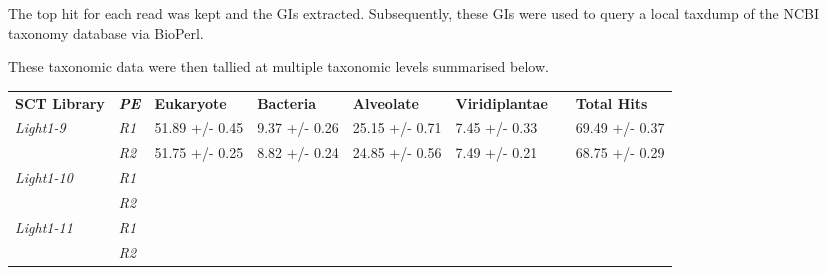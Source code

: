 The top hit for each read was kept and the GIs extracted.  Subsequently, these GIs were used to query
a local taxdump of the NCBI taxonomy database via BioPerl.

These taxonomic data were then tallied at multiple taxonomic levels summarised below.




\begin{table}[h]
\begin{tabular}{@{}|l|l|llllll@{}}
\toprule
\textbf{SCT Library} & \textit{\textbf{PE}} & \multicolumn{1}{l|}{\textbf{Eukaryote}} & \multicolumn{1}{l|}{\textbf{Bacteria}} & \multicolumn{1}{l|}{\textbf{Alveolate}} & \multicolumn{1}{l|}{\textbf{Viridiplantae}} & \multicolumn{1}{l|}{} & \multicolumn{1}{l|}{\textbf{Total Hits}} \\ \cmidrule(r){1-6} \cmidrule(l){8-8} 
\textit{Light1-9}    & \textit{R1}          & \multicolumn{1}{l|}{51.89 +/- 0.45}     & \multicolumn{1}{l|}{9.37 +/- 0.26}     & \multicolumn{1}{l|}{25.15 +/-  0.71}    & \multicolumn{1}{l|}{7.45 +/- 0.33}          & \multicolumn{1}{l|}{} & 69.49 +/- 0.37                           \\ \cmidrule(lr){2-2}
                     & \textit{R2}          & 51.75 +/- 0.25                          & 8.82 +/- 0.24                          & 24.85 +/- 0.56                          & 7.49 +/- 0.21                               &                       & 68.75 +/- 0.29                           \\ \cmidrule(r){1-2}
\textit{Light1-10}   & \textit{R1}          &                                         &                                        &                                         & \multicolumn{1}{l|}{}                       & \multicolumn{1}{l|}{} &                                          \\ \cmidrule(lr){2-2}
                     & \textit{R2}          &                                         &                                        &                                         &                                             &                       &                                          \\ \cmidrule(r){1-2}
\textit{Light1-11}   & \textit{R1}          &                                         &                                        &                                         & \multicolumn{1}{l|}{}                       & \multicolumn{1}{l|}{} &                                          \\ \cmidrule(lr){2-2}
                     & \textit{R2}          &                                         &                                        &                                         &                                             &                       &                                          \\ \cmidrule(r){1-2}

\end{tabular}
\end{table}
